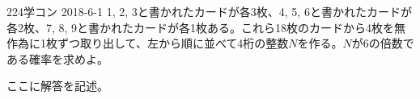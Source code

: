 \begin{prob}{224}{\maru}{学コン 2018-6-1}
 1, 2, 3と書かれたカードが各3枚、4, 5, 6と書かれたカードが各2枚、7, 8, 9と書かれたカードが各1枚ある。これら18枚のカードから4枚を無作為に1枚ずつ取り出して、左から順に並べて4桁の整数$N$を作る。$N$が6の倍数である確率を求めよ。
\end{prob}
ここに解答を記述。